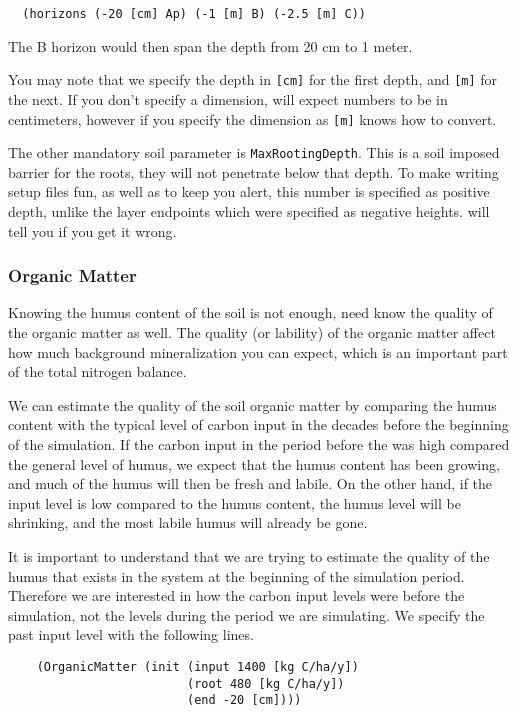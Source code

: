 \documentclass[a4paper,11pt]{article}
\begin{document}
\begin{verbatim}
  (horizons (-20 [cm] Ap) (-1 [m] B) (-2.5 [m] C))
\end{verbatim}

The B horizon would then span the depth from 20 cm to 1
meter.

You may note that we specify the depth in \verb|[cm]| for the first
depth, and \verb|[m]| for the next.  If you don't specify a dimension,
\daisy{} will expect numbers to be in centimeters, however if you
specify the dimension as \verb|[m]| knows how to convert.  

The other mandatory soil parameter is \texttt{MaxRootingDepth}.  This
is a soil imposed barrier for the roots, they will not penetrate below
that depth.  To make writing \daisy{} setup files fun, as well as to
keep you alert, this number is specified as positive depth, unlike the
layer endpoints which were specified as negative heights.  \Daisy{}
will tell you if you get it wrong.

\subsubsection{Organic Matter}
\label{ex:om}

Knowing the humus content of the soil is not enough, \daisy{} need know
the quality of the organic matter as well.  The quality (or lability)
of the organic matter affect how much background mineralization you
can expect, which is an important part of the total nitrogen balance.

We can estimate the quality of the soil organic matter by comparing
the humus content with the typical level of carbon input in the
decades before the beginning of the simulation.  If the carbon input
in the period before the was high compared the general level of humus,
we expect that the humus content has been growing, and much of the
humus will then be fresh and labile.  On the other hand, if the input
level is low compared to the humus content, the humus level will be
shrinking, and the most labile humus will already be gone.

It is important to understand that we are trying to estimate the
quality of the humus that exists in the system at the beginning of the
simulation period.  Therefore we are interested in how the carbon
input levels were before the simulation, not the levels during the
period we are simulating.  We specify the past input level with the
following lines.

\begin{verbatim}
    (OrganicMatter (init (input 1400 [kg C/ha/y])
                         (root 480 [kg C/ha/y])
                         (end -20 [cm])))
\end{verbatim}
\end{document}
